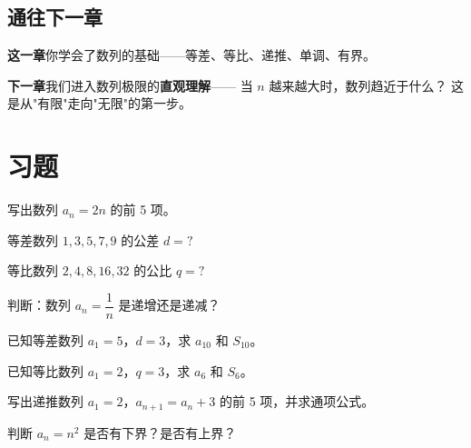 \subsection*{通往下一章}

\textbf{这一章}你学会了数列的基础——等差、等比、递推、单调、有界。

\textbf{下一章}我们进入数列极限的\textbf{直观理解}——
当 \(n\) 越来越大时，数列趋近于什么？
这是从"有限"走向"无限"的第一步。


\section{习题}


\begin{exercise}[0]
写出数列 \(a_n = 2n\) 的前 5 项。
\end{exercise}

\begin{exercise}[0]
等差数列 \(1, 3, 5, 7, 9\) 的公差 \(d = ?\)
\end{exercise}

\begin{exercise}[0]
等比数列 \(2, 4, 8, 16, 32\) 的公比 \(q = ?\)
\end{exercise}

\begin{exercise}[0]
判断：数列 \(a_n = \dfrac{1}{n}\) 是递增还是递减？
\end{exercise}


\begin{exercise}[1]
已知等差数列 \(a_1 = 5\)，\(d = 3\)，求 \(a_{10}\) 和 \(S_{10}\)。
\end{exercise}

\begin{exercise}[1]
已知等比数列 \(a_1 = 2\)，\(q = 3\)，求 \(a_6\) 和 \(S_6\)。
\end{exercise}

\begin{exercise}[1]
写出递推数列 \(a_1 = 2\)，\(a_{n+1} = a_n + 3\) 的前 5 项，并求通项公式。
\end{exercise}

\begin{exercise}[1]
判断 \(a_n = n^2\) 是否有下界？是否有上界？
\end{exercise}

